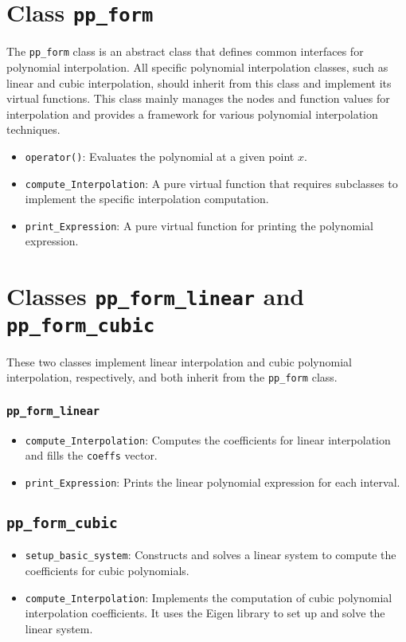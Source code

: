 \documentclass[a4paper]{article}
\begin{document}
\section{Class \texttt{pp\_form}}

The \texttt{pp\_form} class is an abstract class that defines common interfaces for polynomial interpolation. All specific polynomial interpolation classes, such as linear and cubic interpolation, should inherit from this class and implement its virtual functions. This class mainly manages the nodes and function values for interpolation and provides a framework for various polynomial interpolation techniques.

\begin{itemize}
    \item \texttt{operator()}: Evaluates the polynomial at a given point \(x\).
    \item \texttt{compute\_Interpolation}: A pure virtual function that requires subclasses to implement the specific interpolation computation.
    \item \texttt{print\_Expression}: A pure virtual function for printing the polynomial expression.
\end{itemize}

\section{Classes \texttt{pp\_form\_linear} and \texttt{pp\_form\_cubic}}

These two classes implement linear interpolation and cubic polynomial interpolation, respectively, and both inherit from the \texttt{pp\_form} class.

\subsubsection{\texttt{pp\_form\_linear}}
\begin{itemize}
    \item \texttt{compute\_Interpolation}: Computes the coefficients for linear interpolation and fills the \texttt{coeffs} vector.
    \item \texttt{print\_Expression}: Prints the linear polynomial expression for each interval.
\end{itemize}

\subsection{\texttt{pp\_form\_cubic}}
\begin{itemize}
    \item \texttt{setup\_basic\_system}: Constructs and solves a linear system to compute the coefficients for cubic polynomials.
    \item \texttt{compute\_Interpolation}: Implements the computation of cubic polynomial interpolation coefficients. It uses the Eigen library to set up and solve the linear system.
\end{itemize}
\end{document}
